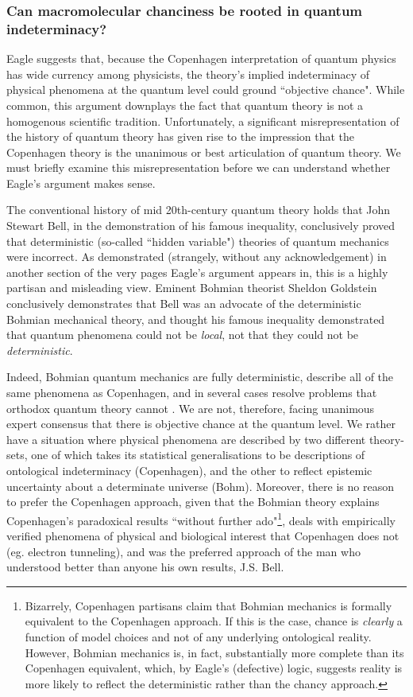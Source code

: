 \subsubsection{Can macromolecular chanciness be rooted in quantum indeterminacy?}
Eagle suggests that, because the Copenhagen interpretation of quantum physics has wide currency among physicists, the theory's implied indeterminacy of physical phenomena at the quantum level could ground ``objective chance". While common, this argument downplays the fact that quantum theory is not a homogenous scientific tradition. Unfortunately, a significant misrepresentation of the history of quantum theory has given rise to the impression that the Copenhagen theory is the unanimous or best articulation of quantum theory. We must briefly examine this misrepresentation before we can understand whether Eagle's argument makes sense.

The conventional history of mid 20th-century quantum theory holds that John Stewart Bell, in the demonstration of his famous inequality, conclusively proved that deterministic (so-called ``hidden variable") theories of quantum mechanics were incorrect. As demonstrated (strangely, without any acknowledgement) in another section of the very pages Eagle's argument appears in, this is a highly partisan and misleading view. Eminent Bohmian theorist Sheldon Goldstein conclusively demonstrates that Bell was an advocate of the deterministic Bohmian mechanical theory, and thought his famous inequality demonstrated that quantum phenomena could not be \textit{local}, not that they could not be \textit{deterministic}\cite{Goldstein2017}.

Indeed, Bohmian quantum mechanics are fully deterministic, describe all of the same phenomena as Copenhagen, and in several cases resolve problems that orthodox quantum theory cannot \cite{Goldstein2017}. We are not, therefore, facing unanimous expert consensus that there is objective chance at the quantum level. We rather have a situation where physical phenomena are  described by two different theory-sets, one of which takes its statistical generalisations to be descriptions of ontological indeterminacy (Copenhagen), and the other to reflect epistemic uncertainty about a determinate universe (Bohm). Moreover, there is no reason to prefer the Copenhagen approach, given that the Bohmian theory explains Copenhagen's paradoxical results ``without further ado"\cite{Goldstein2017}\footnote{Bizarrely, Copenhagen partisans claim that Bohmian mechanics is formally equivalent to the Copenhagen approach. If this is the case, chance is \textit{clearly} a function of model choices and not of any underlying ontological reality. However, Bohmian mechanics is, in fact, substantially more complete than its Copenhagen equivalent, which, by Eagle's (defective) logic, suggests reality is more likely to reflect the deterministic rather than the chancy approach.}, deals with empirically verified phenomena of physical and biological interest that Copenhagen does not (eg. electron tunneling), and was the preferred approach of the man who understood better than anyone his own results, J.S. Bell.

